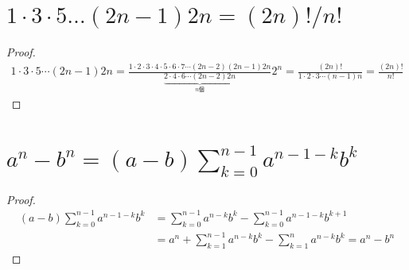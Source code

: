     \section{\texorpdfstring{$1\cdot3\cdot5\dots(2n-1)2n = (2n)!/n!$}{1・3・5・(2n-1)・2n = (2n!)/n!}}
        \begin{proof}
            \begin{align*}
                1 \cdot 3 \cdot 5 \dotsm (2n-1)2n = \frac{1 \cdot 2 \cdot 3 \cdot 4 \cdot 5 \cdot 6 \cdot 7 \dotsm (2n-2)(2n-1)2n}{\underbrace{2 \cdot 4 \cdot 6 \dotsm(2n-2)2n}_{n\text{個}}}2^n = \frac{(2n)!}{1 \cdot 2 \cdot 3 \dotsm (n-1)n} = \frac{(2n)!}{n!}
            \end{align*}
        \end{proof}
    \section{\texorpdfstring{$a^n-b^n = (a-b)\sum_{k=0}^{n-1} a^{n-1-k}b^k$}{a\string^n-b\string^nの分解}}
        \begin{proof}
            \begin{align*}
                (a-b)\sum_{k=0}^{n-1} a^{n-1-k}b^k &= \sum_{k=0}^{n-1} a^{n-k}b^k - \sum_{k=0}^{n-1} a^{n-1-k}b^{k+1} \\
                &= a^n + \sum_{k=1}^{n-1} a^{n-k}b^k - \sum_{k=1}^{n} a^{n-k}b^{k} = a^n - b^n
            \end{align*}
        \end{proof}
